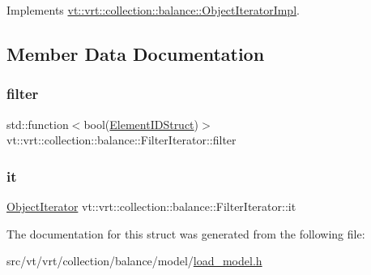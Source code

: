 Implements \hyperlink{structvt_1_1vrt_1_1collection_1_1balance_1_1_object_iterator_impl_ab59b65c6a22626b6d2d3ab283309ac1f}{vt\+::vrt\+::collection\+::balance\+::\+Object\+Iterator\+Impl}.



\subsection{Member Data Documentation}
\mbox{\label{structvt_1_1vrt_1_1collection_1_1balance_1_1_filter_iterator_a89d9841e7176310ab6c712643f88ead7}} 
\subsubsection{\texorpdfstring{filter}{filter}}
{\footnotesize\ttfamily std\+::function$<$bool(\hyperlink{structvt_1_1vrt_1_1collection_1_1balance_1_1_element_i_d_struct}{Element\+I\+D\+Struct})$>$ vt\+::vrt\+::collection\+::balance\+::\+Filter\+Iterator\+::filter}

\mbox{\label{structvt_1_1vrt_1_1collection_1_1balance_1_1_filter_iterator_a908bc73f57f49c2f615119ac87b253a8}} 
\subsubsection{\texorpdfstring{it}{it}}
{\footnotesize\ttfamily \hyperlink{structvt_1_1vrt_1_1collection_1_1balance_1_1_object_iterator}{Object\+Iterator} vt\+::vrt\+::collection\+::balance\+::\+Filter\+Iterator\+::it}



The documentation for this struct was generated from the following file\+:\begin{DoxyCompactItemize}
\item 
src/vt/vrt/collection/balance/model/\hyperlink{load__model_8h}{load\+\_\+model.\+h}\end{DoxyCompactItemize}
